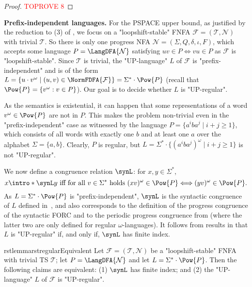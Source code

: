 \documentclass[a4paper,USenglish,cleveref,autoref,thm-restate]{lipics-v2021}
\newcommand{\mc}[1]{\ensuremath{\mathcal{#1}}}
\newcommand{\T}{\mc{T}}
\newcommand{\F}{\mc{F}}
\newcommand{\N}{\mc{N}}
\newcommand{\PSPACE}{\textsf{PSPACE}\xspace}
\begin{document}
\begin{proof}\textcolor{red}{TOPROVE 8}\end{proof}








\noindent\textbf{Prefix-independent languages.}
For the \PSPACE upper bound, as justified by the reduction to (3) of , we focus on a "loopshift-stable" FNFA $\F = (\T,\N)$ with trivial $\T$. So there is only one progress NFA $\N = (\Sigma, Q, \delta, \iota, F)$, which accepts some language $P = \LangDFA{\N}$ satisfying $uv \in P \Leftrightarrow vu \in P$ as $\F$ is "loopshift-stable".
Since $\T$ is trivial, the "UP-language" $L$ of $\F$ is "prefix-independent" and is of the form $L = \{u\cdot v^\omega \mid (u,v) \in \NormFDFA{\F}\} = \Sigma^* \cdot \Pow{P}$ (recall that $\Pow{P} = \{v^{\omega} : v \in P\}$). Our goal is to decide whether $L$ is "UP-regular".

As the semantics is existential, it can happen that some representations of  a word $v^\omega \in \Pow{P}$ are not in $P$.
This makes the problem non-trivial even in the "prefix-independent" case as witnessed by the language $P = \{a^iba^j \mid i+j \ge 1\}$, which consists of all words with exactly one $b$ and at least one $a$ over the alphabet $\Sigma = \{a,b\}$.
Clearly, $P$ is regular, but $L = \Sigma^* \cdot \{\left(a^iba^j\right)^\omega \mid i+j \ge 1\}$ is not "UP-regular".

\AP
We now define a congruence relation $\synL$: for $x, y \in \Sigma^*$,
\[ x \intro*\synL y \text{ iff for all } v\in\Sigma^* \text{ holds } (xv)^{\omega} \in \Pow{P} \Longleftrightarrow (yv)^{\omega} \in \Pow{P}. \]
As $L = \Sigma^* \cdot \Pow{P}$ is "prefix-independent", $\synL$ is the syntactic congruence of $L$ defined in~\cite{Arnold85}, and also corresponds to the definition of the progress congruence of the syntactic FORC \cite{MalerS97} and to the periodic progress congruence from \cite{AngluinF16} (where the latter two are only defined for regular $\omega$-languages). It follows from results in \cite{CalbrixNP93,AngluinBF18} that $L$ is "UP-regular" if, and only if, $\synL$ has finite index.

\begin{restatable}{rstlemma}{rstregularEquivalent}
  \label{lem:regularEquivalent}
  Let $\F=(\T,\N)$ be a "loopshift-stable" FNFA with trivial TS $\T$; let $P=\LangDFA{\N}$ and let $L = \Sigma^* \cdot \Pow{P}$.
  Then the following claims are equivalent:
(1) $\synL$ has finite index; and (2) the "UP-language" $L$ of $\F$ is "UP-regular".
\end{restatable}
\end{document}
